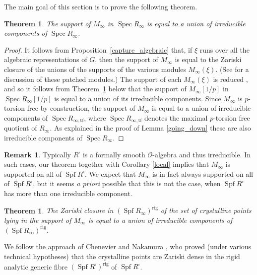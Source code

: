 \documentclass[11pt]{article}
\let\mathcal\mathscr
\newcommand{\ssquare}{{\scriptscriptstyle\square}}
\newtheorem{thm}[prop]{Theorem}
\theoremstyle{definition}
\newtheorem{remark}[prop]{Remark}
\DeclareMathOperator{\Spf}{Spf}
\DeclareMathOperator{\Spec}{Spec}
\newcommand{\cO}{\mathcal{O}}
\newcommand\rig{\mathrm{rig}}
\begin{document}
The main goal of this section is to prove the following theorem.

\begin{thm}
\label{thm:support}
The support
of $M_{\infty}$ in $\Spec R_{\infty}$ is equal to
a union of irreducible components of $\Spec R_{\infty}$.
\end{thm}

\begin{proof}
It follows from Proposition~\ref{capture_algebraic}
that, if $\xi$ runs over all the algebraic representations
of $G$, then the support of $M_{\infty}$ is
equal to the Zariski closure of the unions of the supports
of the various modules $M_{\infty}(\xi)$.
(See \cite{six-authors} for a discussion of these patched
modules.)
The support of each $M_{\infty}(\xi)$ is reduced
\cite[Lem.\,4.17]{six-authors},
and so it follows from Theorem~\ref{rigid support}
below that the support of $M_\infty[1/p]$ in $\Spec R_{\infty}[1/p]$ is equal to
a union of its irreducible components. Since $M_{\infty}$ is $p$-torsion free
by construction, the support of $M_{\infty}$ is equal to a union of irreducible components
of $\Spec R_{\infty, \mathrm{tf}}$, where $\Spec R_{\infty, \mathrm{tf}}$ denotes the maximal
$p$-torsion free quotient of $R_{\infty}$. As explained in the proof of Lemma \ref{going_down}
these are also irreducible components of $\Spec R_{\infty}$.
\end{proof}

\begin{remark} Typically $R^\ssquare$
is a formally smooth $\cO$-algebra and thus irreducible.
In such cases, our theorem together with Corollary \ref{local} implies
that $M_{\infty}$ is supported on all of $\Spf R^\ssquare$. We expect that $M_{\infty}$ is in fact
always supported on all of $\Spf R^\ssquare$, but it seems {\em a priori}
possible that this is not the case, when $\Spf R^\ssquare$
has more than one irreducible component.
\end{remark}

\begin{thm}
\label{rigid support}
The Zariski closure in $(\Spf R_{\infty})^{\rig}$
of the set of crystalline points \hbox{lying} in the support of $M_{\infty}$ is
equal to
a union of irreducible components of $(\Spf R_{\infty})^{\rig}$.
\end{thm}

We follow the approach of Chenevier \cite{Chenevier}
and Nakamura \cite{Nakamura}, who proved (under various technical
hypotheses) that
the crystalline points are Zariski dense in the rigid analytic generic
fibre $(\Spf R^\ssquare)^{\rig}$
of $\Spf R^\ssquare$.
\end{document}
